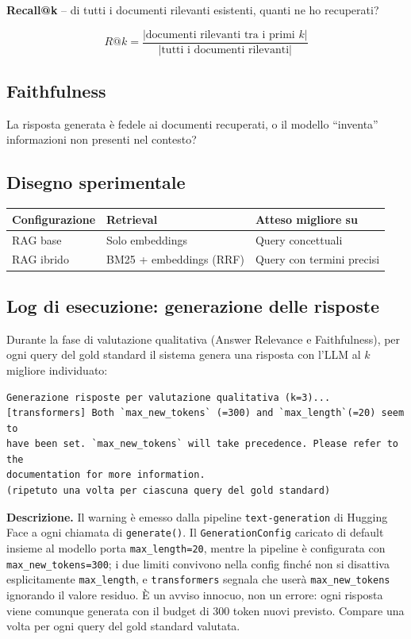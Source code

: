 \documentclass[12pt,a4paper]{article}
\begin{document}
\textbf{Recall@k} -- di tutti i documenti rilevanti esistenti, quanti ne ho recuperati?

\[
R@k = \frac{|\text{documenti rilevanti tra i primi } k|}{|\text{tutti i documenti rilevanti}|}
\]

\subsection{Faithfulness}

La risposta generata \`e fedele ai documenti recuperati, o il modello ``inventa'' informazioni non presenti nel contesto?

\subsection{Disegno sperimentale}

\begin{center}
\begin{tabular}{lll}
\toprule
\textbf{Configurazione} & \textbf{Retrieval} & \textbf{Atteso migliore su} \\
\midrule
RAG base  & Solo embeddings & Query concettuali \\
RAG ibrido & BM25 + embeddings (RRF) & Query con termini precisi \\
\bottomrule
\end{tabular}
\end{center}

\subsection{Log di esecuzione: generazione delle risposte}

Durante la fase di valutazione qualitativa (Answer Relevance e Faithfulness), per ogni query del gold standard il sistema genera una risposta con l'LLM al $k$ migliore individuato:

\begin{verbatim}
Generazione risposte per valutazione qualitativa (k=3)...
[transformers] Both `max_new_tokens` (=300) and `max_length`(=20) seem to
have been set. `max_new_tokens` will take precedence. Please refer to the
documentation for more information.
(ripetuto una volta per ciascuna query del gold standard)
\end{verbatim}

\textbf{Descrizione.} Il warning \`e emesso dalla pipeline \texttt{text-generation} di Hugging Face a ogni chiamata di \texttt{generate()}. Il \texttt{GenerationConfig} caricato di default insieme al modello porta \texttt{max\_length=20}, mentre la pipeline \`e configurata con \texttt{max\_new\_tokens=300}; i due limiti convivono nella config finch\'e non si disattiva esplicitamente \texttt{max\_length}, e \texttt{transformers} segnala che user\`a \texttt{max\_new\_tokens} ignorando il valore residuo. \`E un avviso innocuo, non un errore: ogni risposta viene comunque generata con il budget di 300 token nuovi previsto. Compare una volta per ogni query del gold standard valutata.
\end{document}

